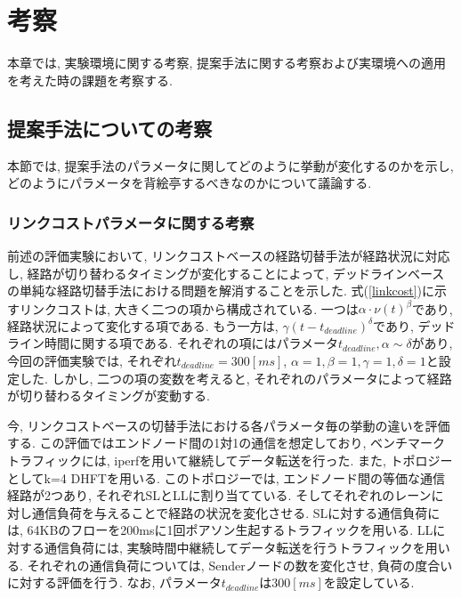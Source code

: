 \chapter{考察}
\label{chapter:consideration}
本章では, 実験環境に関する考察, 提案手法に関する考察および実環境への適用を考えた時の課題を考察する. 

\section{提案手法についての考察}
本節では, 提案手法のパラメータに関してどのように挙動が変化するのかを示し, どのようにパラメータを背絵亭するべきなのかについて議論する. 

\subsection{リンクコストパラメータに関する考察}
前述の評価実験において, リンクコストベースの経路切替手法が経路状況に対応し, 経路が切り替わるタイミングが変化することによって,
デッドラインベースの単純な経路切替手法における問題を解消することを示した. 
式(\ref{linkcost})に示すリンクコストは, 大きく二つの項から構成されている. 
一つは$\alpha \cdot \nu(t)^\beta$であり, 経路状況によって変化する項である. 
もう一方は, $\gamma (t - t_{deadline})^\delta$であり, デッドライン時間に関する項である. 
それぞれの項にはパラメータ$t_{deadline}, \alpha \sim \delta$があり, 今回の評価実験では,
それぞれ$t_{deadline}=300[ms]$, $\alpha=1, \beta=1, \gamma=1, \delta=1$と設定した. 
しかし, 二つの項の変数を考えると, それぞれのパラメータによって経路が切り替わるタイミングが変動する. 

今, リンクコストベースの切替手法における各パラメータ毎の挙動の違いを評価する.  
この評価ではエンドノード間の1対1の通信を想定しており, ベンチマークトラフィックには, iperfを用いて継続してデータ転送を行った.  
また, トポロジーとしてk=4 DHFTを用いる. 
このトポロジーでは, エンドノード間の等価な通信経路が2つあり, それぞれSLとLLに割り当てている. 
そしてそれぞれのレーンに対し通信負荷を与えることで経路の状況を変化させる. 
SLに対する通信負荷には, 64KBのフローを200msに1回ポアソン生起するトラフィックを用いる. 
LLに対する通信負荷には, 実験時間中継続してデータ転送を行うトラフィックを用いる. 
それぞれの通信負荷については, Senderノードの数を変化させ, 負荷の度合いに対する評価を行う. 
なお, パラメータ$t_{deadline}$は$300[ms]$を設定している. 

